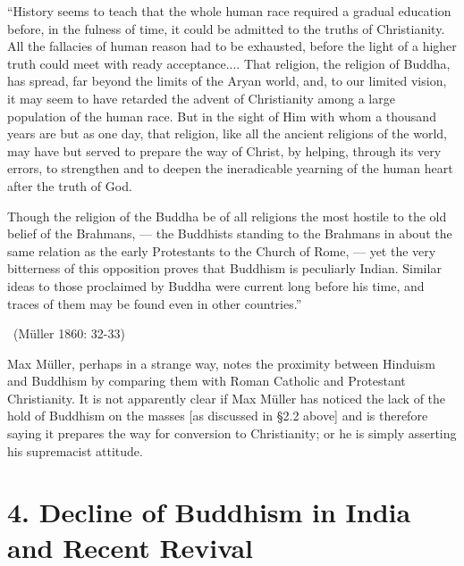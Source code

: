 \newpage

\begin{myquote}
“History seems to teach that the whole human race required a gradual education before, in the fulness of time, it could be admitted to the truths of Christianity. All the fallacies of human reason had to be exhausted, before the light of a higher truth could meet with ready acceptance.... That religion, the religion of Buddha, has spread, far beyond the limits of the Aryan world, and, to our limited vision, it may seem to have retarded the advent of Christianity among a large population of the human race. But in the sight of Him with whom a thousand years are but as one day, that religion, like all the ancient religions of the world, may have but served to prepare the way of Christ, by helping, through its very errors, to strengthen and to deepen the ineradicable yearning of the human heart after the truth of God.
\end{myquote}

\begin{myquote}
Though the religion of the Buddha be of all religions the most hostile to the old belief of the Brahmans, — the Buddhists standing to the Brahmans in about the same relation as the early Protestants to the Church of Rome, — yet the very bitterness of this opposition proves that Buddhism is peculiarly Indian. Similar ideas to those proclaimed by Buddha were current long before his time, and traces of them may be found even in other countries.” 

~\hfill (Müller 1860: 32-33)
\end{myquote}

Max Müller, perhaps in a strange way, notes the proximity between Hinduism and Buddhism by comparing them with Roman Catholic and Protestant Christianity. It is not apparently clear if Max Müller has noticed the lack of the hold of Buddhism on the masses [as discussed in §2.2 above] and is therefore saying it prepares the way for conversion to Christianity; or he is simply asserting his supremacist attitude.

\vspace{-.3cm}

\section*{4. Decline of Buddhism in India \hfill\break and Recent Revival}

